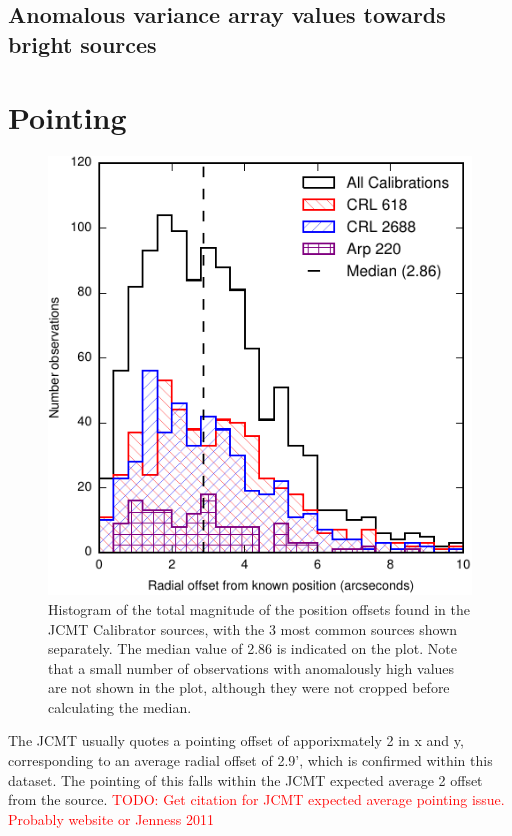 \documentclass[twocolumn]{aastex6}
\newcommand{\todo}[1]{\textcolor{red}{TODO: #1}}
\begin{document}
\subsection{Anomalous variance array values towards bright sources}

\section{Pointing}
\begin{figure}
  \centering
  \includegraphics{pointing-offsets-by-source.pdf}
  \caption{Histogram of the total magnitude of the position offsets
    found in the JCMT Calibrator sources, with the 3 most common
    sources shown separately. The median value of 2.86\arcsec{} is
    indicated on the plot. Note that a small number of observations
    with anomalously high values are not shown in the plot, although
    they were not cropped before calculating the median.}
  \label{fig:pointing}
\end{figure}

The JCMT usually quotes a pointing offset of apporixmately 2\arcsec{}
in x and y, corresponding to an average radial offset of
2.9'\arcsec{}, which is confirmed within this dataset.
The pointing of this falls within the JCMT expected average 2\arcsec{} offset
from the source. \todo{Get citation for JCMT expected average pointing
  issue. Probably website or Jenness 2011}
\end{document}
